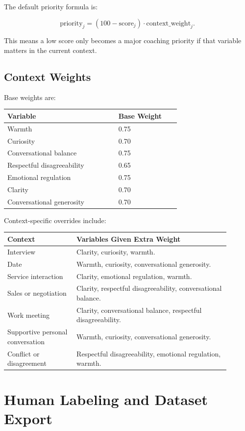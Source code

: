 \documentclass[11pt]{article}
\begin{document}
The default priority formula is:

\[
\text{priority}_j = (100 - \text{score}_j) \cdot \text{context\_weight}_j.
\]

This means a low score only becomes a major coaching priority if that variable matters in the current context.

\subsection{Context Weights}

Base weights are:

\begin{longtable}{p{0.45\linewidth}p{0.25\linewidth}}
\toprule
\textbf{Variable} & \textbf{Base Weight} \\
\midrule
Warmth & 0.75 \\
Curiosity & 0.70 \\
Conversational balance & 0.75 \\
Respectful disagreeability & 0.65 \\
Emotional regulation & 0.75 \\
Clarity & 0.70 \\
Conversational generosity & 0.70 \\
\bottomrule
\end{longtable}

Context-specific overrides include:

\begin{longtable}{p{0.28\linewidth}p{0.62\linewidth}}
\toprule
\textbf{Context} & \textbf{Variables Given Extra Weight} \\
\midrule
Interview & Clarity, curiosity, warmth. \\
Date & Warmth, curiosity, conversational generosity. \\
Service interaction & Clarity, emotional regulation, warmth. \\
Sales or negotiation & Clarity, respectful disagreeability, conversational balance. \\
Work meeting & Clarity, conversational balance, respectful disagreeability. \\
Supportive personal conversation & Warmth, curiosity, conversational generosity. \\
Conflict or disagreement & Respectful disagreeability, emotional regulation, warmth. \\
\bottomrule
\end{longtable}

\section{Human Labeling and Dataset Export}
\end{document}
